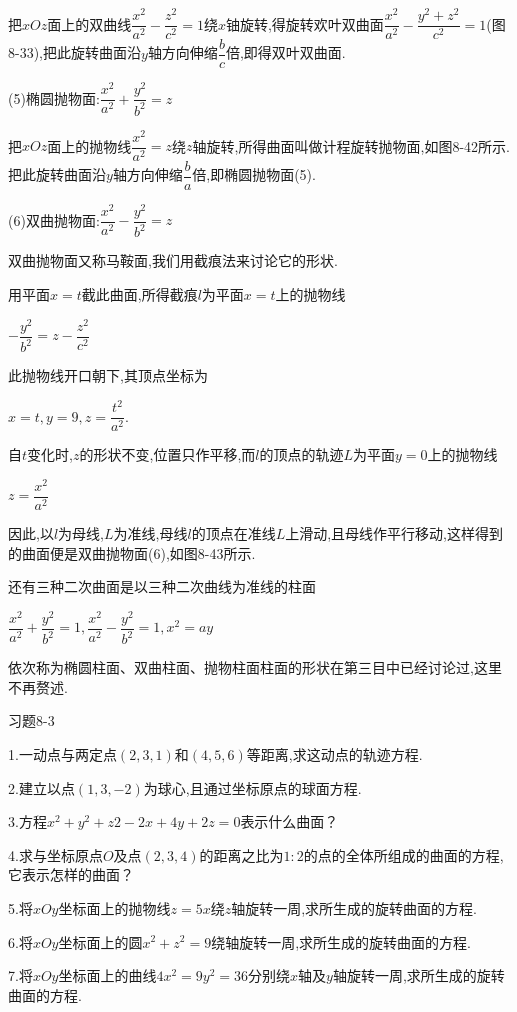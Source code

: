 \documentclass[oneside]{book}
\begin{document}
把$xOz$面上的双曲线$\dfrac{{{x^2}}}{{{a^2}}} - \dfrac{{{z^2}}}{{{c^2}}} = 1$绕$x$铀旋转,得旋转欢叶双曲面$\dfrac{{{x^2}}}{{{a^2}}} - \dfrac{{{y^2} + {z^2}}}{{{c^2}}} = 1$(图8-33),把此旋转曲面沿$y$轴方向伸缩$\dfrac{b}{c}$倍,即得双叶双曲面.

(5)椭圆抛物面:$\dfrac{{{x^2}}}{{{a^2}}} + \dfrac{{{y^2}}}{{{b^2}}} = z$

把$xOz$面上的抛物线$\dfrac{{{x^2}}}{{{a^2}}} = z$绕$z$轴旋转,所得曲面叫做计程旋转抛物面,如图8-42所示.把此旋转曲面沿$y$轴方向伸缩$\dfrac{b}{a}$倍,即椭圆抛物面(5).

(6)双曲抛物面:$\dfrac{{{x^2}}}{{{a^2}}} - \dfrac{{{y^2}}}{{{b^2}}} = z$

双曲抛物面又称马鞍面,我们用截痕法来讨论它的形状.

用平面$x=t$截此曲面,所得截痕$l$为平面$x=t$上的抛物线

$ - \dfrac{{{y^2}}}{{{b^2}}} = z - \dfrac{{{z^2}}}{{{c^2}}}$

此抛物线开口朝下,其顶点坐标为

$x = t,y = 9,z = \dfrac{{{t^2}}}{{{a^2}}}$.

自$t$变化时,$z$的形状不变,位置只作平移,而$l$的顶点的轨迹$L$为平面$y=0$上的抛物线

$z = \dfrac{{{x^2}}}{{{a^2}}}$

因此,以$l$为母线,$L$为准线,母线$l$的顶点在准线$L$上滑动,且母线作平行移动,这样得到的曲面便是双曲抛物面(6),如图8-43所示.

还有三种二次曲面是以三种二次曲线为准线的柱面

$\dfrac{{{x^2}}}{{{a^2}}} + \dfrac{{{y^2}}}{{{b^2}}} = 1,\dfrac{{{x^2}}}{{{a^2}}} - \dfrac{{{y^2}}}{{{b^2}}} = 1,{x^2} = ay$

依次称为椭圆柱面、双曲柱面、抛物柱面柱面的形状在第三目中已经讨论过,这里不再赘述.

习题8-3

1.一动点与两定点$(2,3,1)$和$(4,5,6)$等距离,求这动点的轨迹方程.

2.建立以点$(1,3,-2)$为球心,且通过坐标原点的球面方程.

3.方程${x^2} + {y^2} + z2 - 2x + 4y + 2z = 0$表示什么曲面？

4.求与坐标原点$O$及点$(2,3,4)$的距离之比为$1:2$的点的全体所组成的曲面的方程,它表示怎样的曲面？

5.将$xOy$坐标面上的抛物线$z=5x$绕$z$轴旋转一周,求所生成的旋转曲面的方程.

6.将$xOy$坐标面上的圆${x^2} + {z^2} = 9$绕轴旋转一周,求所生成的旋转曲面的方程.

7.将$xOy$坐标面上的曲线$4{x^2} = 9{y^2} = 36$分别绕$x$轴及$y$轴旋转一周,求所生成的旋转曲面的方程.
\end{document}
